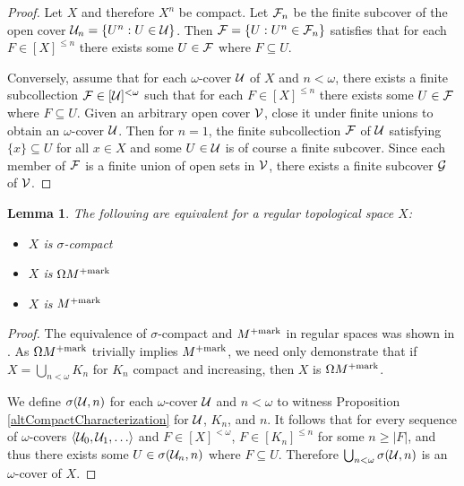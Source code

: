 \documentclass{amsart}
\theoremstyle{plain}
\newtheorem{lemma}[theorem]{Lemma}
\theoremstyle{definition}
\theoremstyle{remark}
\theoremstyle{plain}
\theoremstyle{definition}
\theoremstyle{remark}
\begin{document}
\begin{proof}
  Let \(X\) and therefore \(X^n\) be compact.
  Let \(\mathcal{F}_n\) be the finite subcover of the
  open cover \(\mathcal{U}_n=\{U^n:U\in\mathcal{U}\}\). Then
  \(\mathcal{F}=\{U:U^n\in\mathcal{F}_n\}\) satisfies that for each \(F\in[X]^{\leq n}\)
  there exists some \(U\in\mathcal{F}\) where \(F\subseteq U\).

  Conversely, assume that for each \(\omega\)-cover
  \(\mathcal{U}\) of \(X\) and \(n<\omega\), there exists a finite subcollection
  \(\mathcal{F}\in[\mathcal{U}]^{<\omega}\) such that for each \(F\in[X]^{\leq n}\)
  there exists some \(U\in\mathcal{F}\) where \(F\subseteq U\). Given an
  arbitrary open cover \(\mathcal{V}\), close it under finite unions to obtain
  an \(\omega\)-cover \(\mathcal{U}\). Then for \(n=1\),
  the finite subcollection \(\mathcal{F}\) of \(\mathcal{U}\) satisfying
  \(\{x\}\subseteq U\) for all \(x\in X\) and some \(U\in\mathcal{U}\)
  is of course a finite subcover.
  Since each member of \(\mathcal{F}\) is a finite union of open sets in
  \(\mathcal{V}\), there exists a finite subcover \(\mathcal{G}\) of \(\mathcal{V}\).
\end{proof}

\begin{lemma}
  The following are equivalent for a regular topological space \(X\):
  \begin{itemize}
    \item \(X\) is \(\sigma\)-compact
    \item \(X\) is \(\Omega M^{+\mathrm{mark}}\)
    \item \(X\) is \(M^{+\mathrm{mark}}\)
  \end{itemize}
\end{lemma}

\begin{proof}
  The equivalence of \(\sigma\)-compact and \(M^{+\mathrm{mark}}\) in regular spaces
  was shown in \cite{clontzMengerCMUC}. As \(\Omega M^{+\mathrm{mark}}\)
  trivially implies \(M^{+\mathrm{mark}}\), we need only demonstrate that
  if \(X=\bigcup_{n<\omega} K_n\) for \(K_n\) compact and increasing,
  then \(X\) is \(\Omega M^{+\mathrm{mark}}\).

  We define \(\sigma(\mathcal{U},n)\) for each \(\omega\)-cover \(\mathcal{U}\) and
  \(n<\omega\) to witness Proposition \ref{altCompactCharacterization}
  for \(\mathcal{U}\), \(K_n\), and \(n\). It follows that for every sequence of
  \(\omega\)-covers \(\<\mc U_0,\mc U_1,\dots\>\) and \(F\in[X]^{<\omega}\),
  \(F\in[K_n]^{\leq n}\) for some \(n\geq|F|\), and thus there exists some
  \(U\in\sigma(\mathcal{U}_n,n)\) where \(F\subseteq U\). Therefore
  \(\bigcup_{n<\omega}\sigma(\mathcal{U},n)\) is an \(\omega\)-cover of \(X\).
\end{proof}
\end{document}
